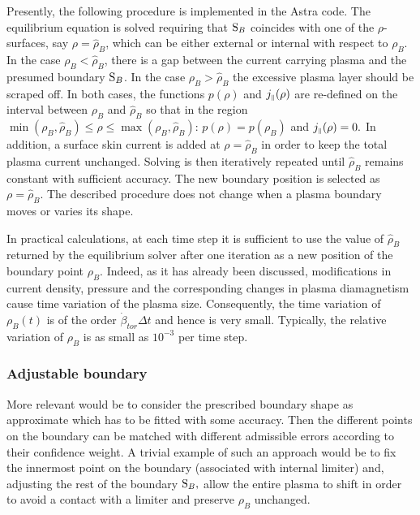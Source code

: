 Presently, the following procedure is implemented in the Astra code.
The equilibrium equation is solved requiring that
$\mbox{\cal S}_B$ coincides with one of the $\rho$-surfaces, say
$\rho=\hat\rho_B$, which can be either external or internal with respect
to $\rho_B$. 
In the case $\rho_B<\hat\rho_B$, there is a gap between the current
carrying plasma and the presumed boundary $\mbox{\cal S}_B$. 
In the case $\rho_B>\hat\rho_B$ the excessive plasma layer should be
scraped off. 
In both cases, the functions $p(\rho)$ and $j_{\scriptscriptstyle\parallel}(\rho)$ are re-defined
on the interval between $\rho_B$ and $\hat\rho_B$ so that in the region
$\min(\rho_B,\hat\rho_B)\leq\rho\leq\max(\rho_B,\hat\rho_B)$:
$p(\rho)=p(\rho_B)$ and $j_{\scriptscriptstyle\parallel}(\rho)=0.$ 
In addition, a surface skin current is added at $\rho=\hat\rho_B$ in
order to keep the total plasma current unchanged. 
Solving  is then iteratively repeated until $\hat\rho_B$
remains constant with sufficient accuracy. 
The new boundary position is selected as $\rho=\hat\rho_B$. 
The described procedure does not change when a plasma boundary moves or
varies its shape. 

In practical calculations, at each time step it is sufficient to use the
value of $\hat\rho_B$ returned by the equilibrium solver after one
iteration as a new position of the boundary point $\rho_B$. 
Indeed, as it has already been discussed, modifications in current
density, pressure and the corresponding changes in plasma
diamagnetism cause time variation of the plasma size. 
Consequently, the time variation of $\rho_B(t)$ is of the order
$\dot\beta_{tor}\Delta t$ and hence is very small. 
Typically, the relative variation of $\rho_B$ is as small as $10^{-3}$
per time step. 

\subsubsection{Adjustable boundary}

More relevant would be to consider the prescribed boundary shape
as approximate which has to be fitted with some accuracy. 
Then the different points on the boundary can be matched with different
admissible errors according to their confidence weight. 
A trivial example of such an approach would be to fix the innermost point
on the boundary (associated with internal limiter) and, adjusting the
rest of the boundary $\mbox{\cal S}_B,$ allow the entire plasma to
shift in order to avoid a contact with a limiter and preserve $\rho_B$
unchanged. 

